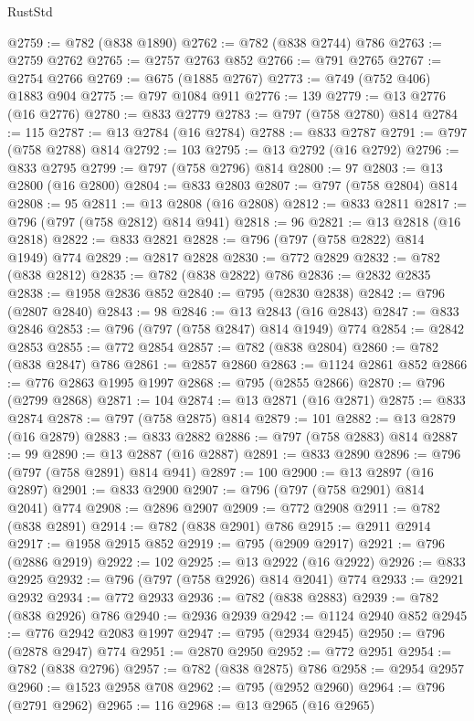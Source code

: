 \begin{lexlean}{RustStd}
\begin{coremodule}
@2759 := @782 (@838 @1890)
@2762 := @782 (@838 @2744) @786
@2763 := @2759 @2762
@2765 := @2757 @2763 @852
@2766 := @791 @2765
@2767 := @2754 @2766
@2769 := @675 (@1885 @2767)
@2773 := @749 (@752 @406) @1883 @904
@2775 := @797 @1084 @911
@2776 := 139
@2779 := @13 @2776 (@16 @2776)
@2780 := @833 @2779
@2783 := @797 (@758 @2780) @814
@2784 := 115
@2787 := @13 @2784 (@16 @2784)
@2788 := @833 @2787
@2791 := @797 (@758 @2788) @814
@2792 := 103
@2795 := @13 @2792 (@16 @2792)
@2796 := @833 @2795
@2799 := @797 (@758 @2796) @814
@2800 := 97
@2803 := @13 @2800 (@16 @2800)
@2804 := @833 @2803
@2807 := @797 (@758 @2804) @814
@2808 := 95
@2811 := @13 @2808 (@16 @2808)
@2812 := @833 @2811
@2817 := @796 (@797 (@758 @2812) @814 @941)
@2818 := 96
@2821 := @13 @2818 (@16 @2818)
@2822 := @833 @2821
@2828 := @796 (@797 (@758 @2822) @814 @1949) @774
@2829 := @2817 @2828
@2830 := @772 @2829
@2832 := @782 (@838 @2812)
@2835 := @782 (@838 @2822) @786
@2836 := @2832 @2835
@2838 := @1958 @2836 @852
@2840 := @795 (@2830 @2838)
@2842 := @796 (@2807 @2840)
@2843 := 98
@2846 := @13 @2843 (@16 @2843)
@2847 := @833 @2846
@2853 := @796 (@797 (@758 @2847) @814 @1949) @774
@2854 := @2842 @2853
@2855 := @772 @2854
@2857 := @782 (@838 @2804)
@2860 := @782 (@838 @2847) @786
@2861 := @2857 @2860
@2863 := @1124 @2861 @852
@2866 := @776 @2863 @1995 @1997
@2868 := @795 (@2855 @2866)
@2870 := @796 (@2799 @2868)
@2871 := 104
@2874 := @13 @2871 (@16 @2871)
@2875 := @833 @2874
@2878 := @797 (@758 @2875) @814
@2879 := 101
@2882 := @13 @2879 (@16 @2879)
@2883 := @833 @2882
@2886 := @797 (@758 @2883) @814
@2887 := 99
@2890 := @13 @2887 (@16 @2887)
@2891 := @833 @2890
@2896 := @796 (@797 (@758 @2891) @814 @941)
@2897 := 100
@2900 := @13 @2897 (@16 @2897)
@2901 := @833 @2900
@2907 := @796 (@797 (@758 @2901) @814 @2041) @774
@2908 := @2896 @2907
@2909 := @772 @2908
@2911 := @782 (@838 @2891)
@2914 := @782 (@838 @2901) @786
@2915 := @2911 @2914
@2917 := @1958 @2915 @852
@2919 := @795 (@2909 @2917)
@2921 := @796 (@2886 @2919)
@2922 := 102
@2925 := @13 @2922 (@16 @2922)
@2926 := @833 @2925
@2932 := @796 (@797 (@758 @2926) @814 @2041) @774
@2933 := @2921 @2932
@2934 := @772 @2933
@2936 := @782 (@838 @2883)
@2939 := @782 (@838 @2926) @786
@2940 := @2936 @2939
@2942 := @1124 @2940 @852
@2945 := @776 @2942 @2083 @1997
@2947 := @795 (@2934 @2945)
@2950 := @796 (@2878 @2947) @774
@2951 := @2870 @2950
@2952 := @772 @2951
@2954 := @782 (@838 @2796)
@2957 := @782 (@838 @2875) @786
@2958 := @2954 @2957
@2960 := @1523 @2958 @708
@2962 := @795 (@2952 @2960)
@2964 := @796 (@2791 @2962)
@2965 := 116
@2968 := @13 @2965 (@16 @2965)

\end{coremodule}
\end{lexlean}
